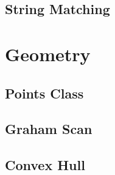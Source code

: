 \documentclass{article}
\begin{document}
\begin{multicols}{3}
\subsection{String Matching}



\section{Geometry}
\subsection{Points Class}


\subsection{Graham Scan}


\subsection{Convex Hull}




\end{multicols}
\end{document}
